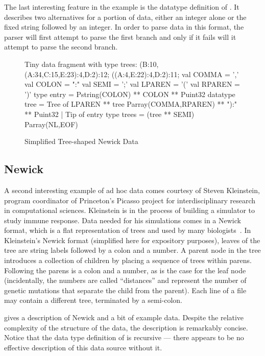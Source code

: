 \documentclass{entcs}
\begin{document}
The last interesting feature in the \dibbler{} example is the
datatype definition of .  It describes
two alternatives for a portion of data, either an integer alone
or the fixed string  followed by an integer.
In order to parse data in this format, the parser will
first attempt to parse the first branch and only if it
fails will it attempt to parse the second branch.

\begin{figure}
\begin{code}
{\rm Tiny data fragment with type trees: }
\mbox{}
(B:10,(A:34,C:15,E:23):4,D:2):12;
((A:4,E:22):4,D:2):11;
\mbox{}
val COMMA  = ','
val COLON  = ":"
val SEMI   = ';'
val LPAREN = '('
val RPAREN = ')'
\mbox{}
type entry = Pstring(COLON) ** COLON ** Puint32
\mbox{}
datatype tree =
    Tree of LPAREN ** tree Parray(COMMA,RPAREN) ** "):" ** Puint32
  | Tip of entry
\mbox{}
type trees = (tree ** SEMI) Parray(NL,EOF)
\end{code}
\caption{Simplified Tree-shaped Newick Data}
\label{fig:newick}
\end{figure}

\subsection{Newick}

A second interesting example of ad hoc data comes courtesy of Steven
Kleinstein, program coordinator of Princeton's Picasso project for
interdisciplinary research in computational sciences.  Kleinstein is
in the process of building a simulator to study immune response.  Data
needed for his simulations comes in a Newick format, which is a flat
representation of trees and used by many biologists~\cite{newick}.  In
Kleinstein's Newick format (simplified here for expository purposes),
leaves of the tree are string labels followed by a colon and a number.
A parent node in the tree introduces a collection of children by
placing a sequence of trees within parens.  Following the parens is a
colon and a number, as is the case for the leaf node (incidentally,
the numbers are called ``distances'' and represent the number of
genetic mutations that separate the child from the parent).  Each line
of a file may contain a different tree, terminated by a semi-colon.

 gives a description of Newick and a bit of example
data.  Despite the relative complexity of the structure of the data,
the description is remarkably concise.  Notice that the data type
definition of  is recursive --- there appears to be no
effective description of this data source without it.
\end{document}
